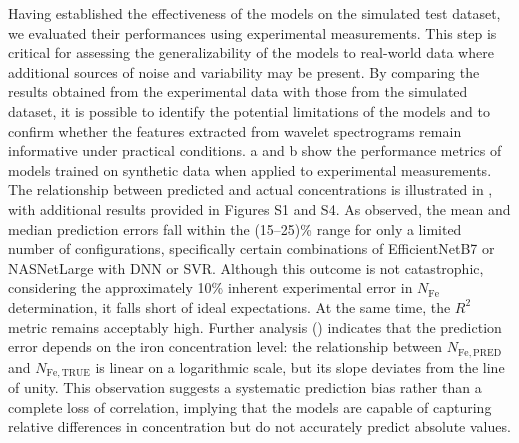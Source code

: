 \documentclass[10pt]{iopart}
\begin{document}
Having established the effectiveness of the models on the simulated test dataset,
we evaluated their performances using experimental measurements.
This step is critical for assessing the generalizability of the models to real-world data
where additional sources of noise and variability may be present.
By comparing the results obtained from the experimental data with those from the simulated dataset,
it is possible to identify the potential limitations of the models
and to confirm whether the features extracted from wavelet spectrograms remain informative under practical conditions.
a and b show the performance metrics of models trained on synthetic data when applied to experimental measurements.
The relationship between predicted and actual concentrations is illustrated in , with additional results provided in Figures S1 and S4.
As observed, the mean and median prediction errors fall within the (15–25)\% range for only a limited number of configurations,
specifically certain combinations of EfficientNetB7 or NASNetLarge with DNN or SVR.
Although this outcome is not catastrophic, considering the approximately 10\% inherent experimental error in $N_\mathrm{Fe}$ determination,
it falls short of ideal expectations.
At the same time, the $R^2$ metric remains acceptably high.
Further analysis () indicates that the prediction error depends on the iron concentration level:
the relationship between $N_\mathrm{Fe,PRED}$ and $N_\mathrm{Fe,TRUE}$ is linear on a logarithmic scale,
but its slope deviates from the line of unity.
This observation suggests a systematic prediction bias rather than a complete loss of correlation,
implying that the models are capable of capturing relative differences in concentration but do not accurately predict absolute values.
\end{document}
